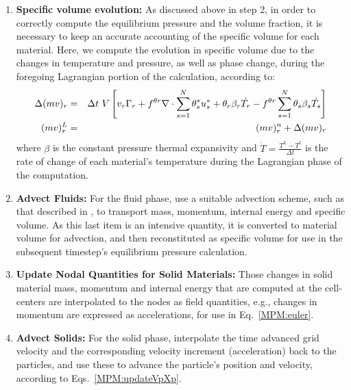 \begin{enumerate}
\item {\bf Specific volume evolution:} As discussed above in step 2, in order to
correctly compute the equilibrium pressure and the volume fraction, it is necessary
to keep an accurate accounting of the specific volume for each material.  Here, 
we compute the evolution in specific volume due to the changes in temperature 
and pressure, as well as phase change, during the foregoing Lagrangian 
portion of the calculation, according to:
\begin{eqnarray}
  \Delta(mv)_r &=& \Delta t~ V 
     \left[ v_r \Gamma_r 
        + f^{\theta r} \nabla \cdot \sum\limits_{s=1}^N{\theta_s^*u_s^*}
               + \theta_r \beta_r \dot{T_r} 
        - f^{\theta r} \sum\limits_{s=1}^N{\theta_s \beta_s \dot{T_s}}\right]   
     \label{eq:eqspvoldiscrete} \\
  (mv)_r^L &=& (mv)_r^n + \Delta(mv)_r \label{eq:eqspvolLag}
\end{eqnarray}
where $\beta$ is the constant pressure thermal expansivity and
$\dot{T}=\frac{T^L - T^t}{\Delta{t}}$ is the rate of change of each material's
temperature during the Lagrangian phase of the computation.

\item {\bf Advect Fluids:} For the fluid phase, use a suitable advection scheme,
such as that described in \cite{Kashiwa1998}, to transport mass, momentum, internal energy 
and specific volume.  As this last item is an intensive quantity, it is converted
to material volume for advection, and then reconstituted as specific volume
for use in the subsequent timestep's equilibrium pressure calculation.

\item{\bf Update Nodal Quantities for Solid Materials:}  Those changes in 
solid material mass, momentum and internal energy that are computed at the 
cell-centers are interpolated to the nodes as field quantities, e.g., changes 
in momentum are expressed as accelerations, for use in Eq.~\ref{MPM:euler}.

\item {\bf Advect Solids:} For the solid phase, interpolate the time advanced
grid velocity and the corresponding velocity increment (acceleration) back 
to the particles, and use these to advance the particle's position and 
velocity, according to Eqs.~\ref{MPM:updateVpXp}.

\end{enumerate}

